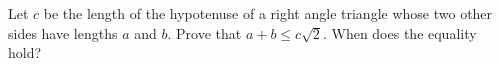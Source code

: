 Let $c$ be the length of the hypotenuse of a right angle triangle whose two other sides have lengths $a$ and $b$. Prove that $a+b\le c\sqrt{2}$. When does the equality hold?